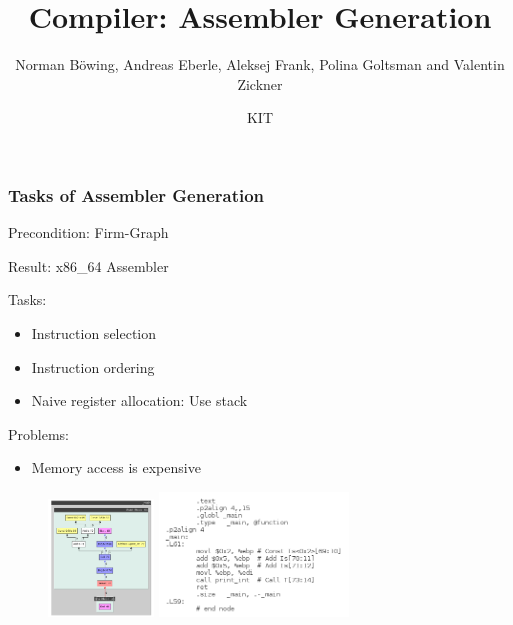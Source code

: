 \documentclass[t]{beamer}
\title[]{Compiler: Assembler Generation}
\subtitle{Norman B\"owing, Andreas Eberle, Aleksej Frank, Polina Goltsman and Valentin Zickner}
\author[Team replimoc: Norman B\"owing, Andreas Eberle, Aleksej Frank, Polina Goltsman and Valentin Zickner]{KIT}
\institute[Institute for Program Structures and Data Organization (IPD)]{KARLSRUHE INSTITUTE OF TECHNOLOGY (KIT)}
\begin{document}
\begin{frame}
  \maketitle
\end{frame}

\begin{frame}
  \frametitle{Tasks of Assembler Generation}
\begin{itemize}
  \item Precondition: Firm-Graph
 {
  \item Result: x86\_64 Assembler
}
 {
  \item Tasks:
  \begin{itemize}
    \item Instruction selection
    \item Instruction ordering
    \item Naive register allocation: Use stack
  \end{itemize}
}
 {
  \item Problems:
  \begin{itemize}
    \item Memory access is expensive
  \end{itemize}
}
\end{itemize}

\begin{figure}
\includegraphics[width=0.25\textwidth]{images/firmgraph.png}
 {
\includegraphics[width=0.45\textwidth]{images/assembler.png}
}
\end{figure}

\end{frame}
\end{document}
